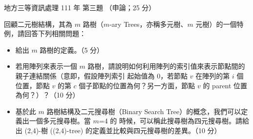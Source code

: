 \begin{pastexam}[label={px:df3-111-ds-03}]{地方三等資訊處理 111 年 第三題}
（申論；25 分）

回顧二元樹結構，其為 $m$ 路樹（$m$-ary Trees，亦稱多元樹、$m$ 元樹）的一個特例，請回答下列相關問題：
\begin{itemize}[leftmargin=2.2em, nosep]
\item[㈠] 給出 $m$ 路樹的定義。（5 分）
\item[㈡] 若用陣列來表示一個 $m$ 路樹，請說明如何利用陣列的索引值來表示節點間的親子連結關係（意即，假設陣列索引
起始值為 $0$，若節點 $v$ 在陣列的第 $i$ 個位置，節點 $v$ 的第 $c$ 個子節點的位置為何？另一方面，節點 $v$ 的
parent 位置為何？）？（10 分）
\item[㈢] 基於此 $m$ 路樹結構及二元搜尋樹（Binary Search Tree）的概念，我們可以定義出一個多元搜尋樹。當 $m$=4 的
時候，可以稱此搜尋樹為四元搜尋樹。請給出 (2,4)-樹 ((2,4)-tree) 的定義並比較與四元搜尋樹的差異。（10 分）
\end{itemize}
\end{pastexam}

